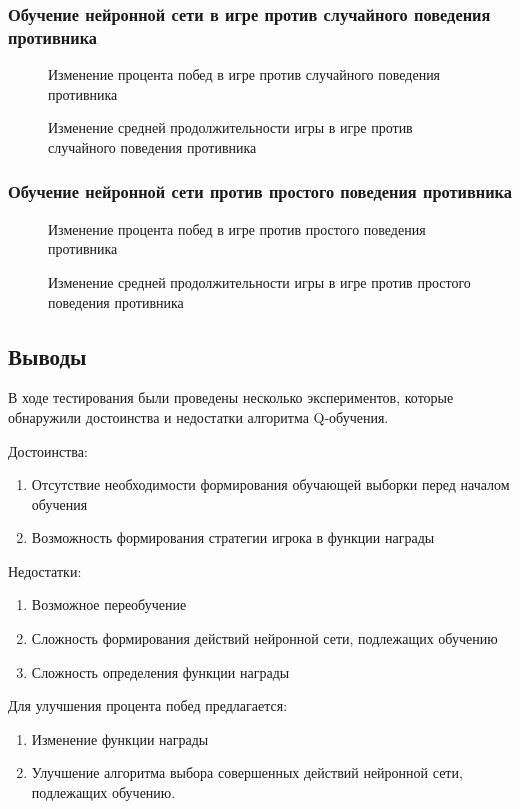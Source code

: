 \subsubsection*{Обучение нейронной сети в игре против случайного поведения противника}
\newpage
\begin{figure}[h!]
    \caption{Изменение процента побед в игре против случайного поведения противника}
\end{figure}
\begin{figure}[h!]
    \caption{Изменение средней продолжительности игры в игре против случайного поведения противника}
\end{figure}
\subsubsection*{Обучение нейронной сети против простого поведения противника}
\begin{figure}[h!]
    \caption{Изменение процента побед в игре против простого поведения противника}
\end{figure}
\begin{figure}[h!]
    \caption{Изменение средней продолжительности игры в игре против простого поведения противника}
\end{figure}
\subsection*{Выводы}
В ходе тестирования были проведены несколько экспериментов, которые обнаружили достоинства и недостатки алгоритма Q-обучения. 

Достоинства:
\begin{spacing}{0.9}
\begin{enumerate}
    \item Отсутствие необходимости формирования обучающей выборки перед началом обучения
    \item Возможность формирования стратегии игрока в функции награды
\end{enumerate}
\end{spacing}

Недостатки:
\begin{spacing}{0.9}
\begin{enumerate}
    \item Возможное переобучение
    \item Сложность формирования действий нейронной сети, подлежащих обучению
    \item Сложность определения функции награды
\end{enumerate}
\end{spacing}

Для улучшения процента побед предлагается:
\begin{spacing}{0.9}
\begin{enumerate}
    \item Изменение функции награды
    \item Улучшение алгоритма выбора совершенных действий нейронной сети, подлежащих обучению.
\end{enumerate}
\end{spacing}